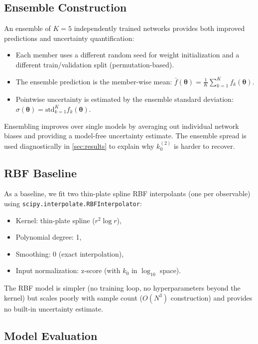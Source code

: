 \documentclass[11pt,a4paper]{article}
\newcommand{\vect}[1]{\boldsymbol{#1}}
\newcommand{\kzero}{k_0}
\begin{document}
\subsection{Ensemble Construction}\label{sec:ensemble}

An ensemble of $K = 5$ independently trained networks provides both
improved predictions and uncertainty quantification:
\begin{itemize}
  \item Each member uses a different random seed for weight initialization
    and a different train/validation split (permutation-based).
  \item The ensemble prediction is the member-wise mean:
    $\bar{f}(\vect{\theta}) = \frac{1}{K}\sum_{k=1}^K f_k(\vect{\theta})$.
  \item Pointwise uncertainty is estimated by the ensemble standard
    deviation: $\sigma(\vect{\theta}) = \mathrm{std}_{k=1}^K f_k(\vect{\theta})$.
\end{itemize}

Ensembling improves over single models by averaging out individual
network biases and providing a model-free uncertainty estimate. The
ensemble spread is used diagnostically in \cref{sec:results} to explain
why $\kzero^{(2)}$ is harder to recover.

\subsection{RBF Baseline}\label{sec:rbf}

As a baseline, we fit two thin-plate spline RBF interpolants (one per
observable) using \texttt{scipy.interpolate.RBFInterpolator}:
\begin{itemize}
  \item Kernel: thin-plate spline ($r^2 \log r$),
  \item Polynomial degree: 1,
  \item Smoothing: 0 (exact interpolation),
  \item Input normalization: z-score (with $k_0$ in $\log_{10}$ space).
\end{itemize}
The RBF model is simpler (no training loop, no hyperparameters beyond
the kernel) but scales poorly with sample count ($O(N^3)$ construction)
and provides no built-in uncertainty estimate.

\subsection{Model Evaluation}\label{sec:model_eval}
\end{document}
